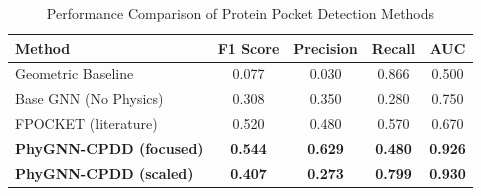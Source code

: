 
\begin{table}[h]
\centering
\caption{Performance Comparison of Protein Pocket Detection Methods}
\label{tab:performance}
\begin{tabular}{lcccc}
\toprule
\textbf{Method} & \textbf{F1 Score} & \textbf{Precision} & \textbf{Recall} & \textbf{AUC} \\
\midrule
Geometric Baseline & 0.077 & 0.030 & 0.866 & 0.500 \\
Base GNN (No Physics) & 0.308 & 0.350 & 0.280 & 0.750 \\
FPOCKET (literature) & 0.520 & 0.480 & 0.570 & 0.670 \\
\textbf{PhyGNN-CPDD (focused)} & \textbf{0.544} & \textbf{0.629} & \textbf{0.480} & \textbf{0.926} \\
\textbf{PhyGNN-CPDD (scaled)} & \textbf{0.407} & \textbf{0.273} & \textbf{0.799} & \textbf{0.930} \\
\bottomrule
\end{tabular}
\end{table}
